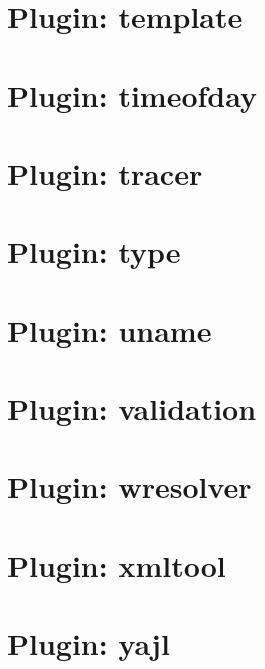 \documentclass[twoside]{book}
\newcommand{\+}{\discretionary{\mbox{\scriptsize$\hookleftarrow$}}{}{}}
\begin{document}
\chapter{Plugin\+: template}
\label{md_src_plugins_template_README}
\hypertarget{md_src_plugins_template_README}{}

\chapter{Plugin\+: timeofday}
\label{md_src_plugins_timeofday_README}
\hypertarget{md_src_plugins_timeofday_README}{}

\chapter{Plugin\+: tracer}
\label{md_src_plugins_tracer_README}
\hypertarget{md_src_plugins_tracer_README}{}

\chapter{Plugin\+: type}
\label{md_src_plugins_type_README}
\hypertarget{md_src_plugins_type_README}{}

\chapter{Plugin\+: uname}
\label{md_src_plugins_uname_README}
\hypertarget{md_src_plugins_uname_README}{}

\chapter{Plugin\+: validation}
\label{md_src_plugins_validation_README}
\hypertarget{md_src_plugins_validation_README}{}

\chapter{Plugin\+: wresolver}
\label{md_src_plugins_wresolver_README}
\hypertarget{md_src_plugins_wresolver_README}{}

\chapter{Plugin\+: xmltool}
\label{md_src_plugins_xmltool_README}
\hypertarget{md_src_plugins_xmltool_README}{}

\chapter{Plugin\+: yajl}
\label{md_src_plugins_yajl_README}
\hypertarget{md_src_plugins_yajl_README}{}

\end{document}
